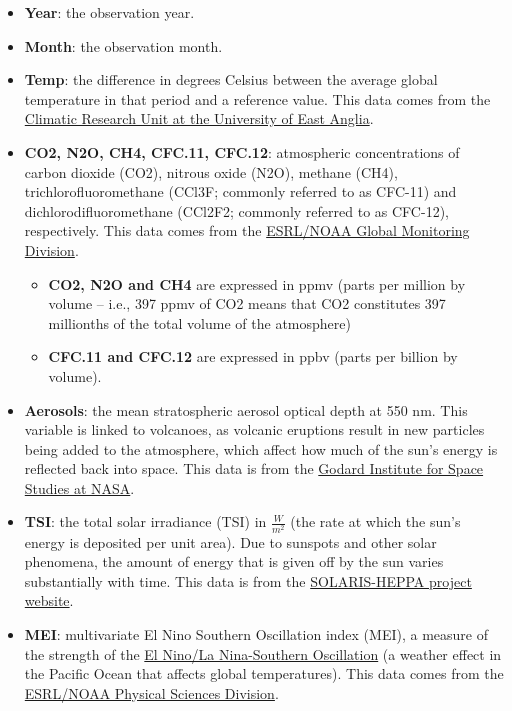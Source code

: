 \documentclass[letterpaper, 9pt, onecolumn, twoside, technote, final]{IEEEtran}
\begin{document}
\begin{itemize}
\item \textbf{Year}: the observation year.

\item \textbf{Month}: the observation month.

\item \textbf{Temp}: the difference in degrees Celsius between the average global
temperature in that period and a reference value. This data comes
from the \href{http://www.cru.uea.ac.uk/cru/data/temperature}{Climatic Research Unit at the University of East Anglia}.

\item \textbf{CO2, N2O, CH4, CFC.11, CFC.12}: atmospheric concentrations of carbon
dioxide (CO2), nitrous oxide (N2O), methane  (CH4),
trichlorofluoromethane (CCl3F; commonly referred to as CFC-11) and
dichlorodifluoromethane (CCl2F2; commonly referred to as CFC-12),
respectively. This data comes from the \href{http://www.esrl.noaa.gov/gmd/ccgg/data-products.html}{ESRL/NOAA Global Monitoring
Division}.

\begin{itemize}
\item \textbf{CO2, N2O and CH4} are expressed in ppmv (parts per million by
volume -- i.e., 397 ppmv of CO2 means that CO2 constitutes 397
millionths of the total volume of the atmosphere)
\item \textbf{CFC.11 and CFC.12} are expressed in ppbv (parts per billion by
volume).
\end{itemize}

\item \textbf{Aerosols}: the mean stratospheric aerosol optical depth at 550
nm. This variable is linked to volcanoes, as volcanic eruptions
result in new particles being added to the atmosphere, which affect
how much of the sun's energy is reflected back into space. This data
is from the \href{http://data.giss.nasa.gov/modelforce/strataer}{Godard Institute for Space Studies at NASA}.

\item \textbf{TSI}: the total solar irradiance (TSI) in $\frac{W}{m^2}$ (the rate
at which the sun's energy is deposited per unit area). Due to
sunspots and other solar phenomena, the amount of energy that is
given off by the sun varies substantially with time. This data is
from the \href{http://solarisheppa.geomar.de/solarisheppa/cmip5}{SOLARIS-HEPPA project website}.

\item \textbf{MEI}: multivariate El Nino Southern Oscillation index (MEI), a
measure of the strength of the \href{http://en.wikipedia.org/wiki/El_nino}{El Nino/La Nina-Southern Oscillation}
(a weather effect in the Pacific Ocean that affects global
temperatures). This data comes from the \href{http://www.esrl.noaa.gov/psd/enso/mei/table.html}{ESRL/NOAA Physical Sciences
Division}.
\end{itemize}
\end{document}
